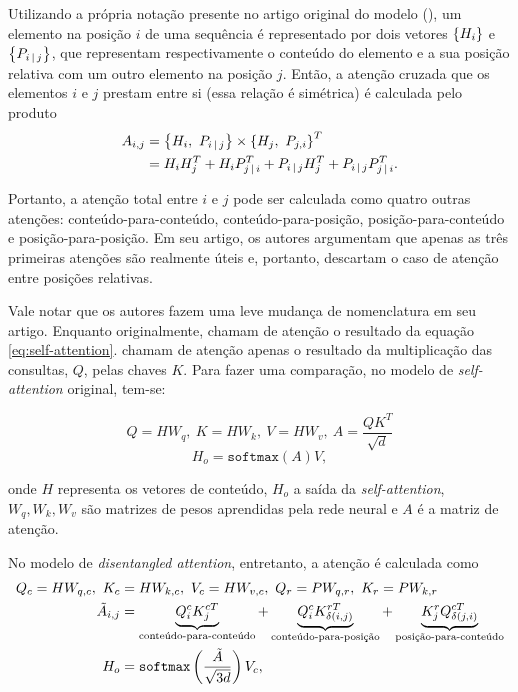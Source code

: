 Utilizando a própria notação presente no artigo original do modelo
(\cite{he-etal:2020:deberta}), um elemento na posição $i$ de uma sequência é
representado por dois vetores $\left\{ H_i \right\}$ e $\left\{ P_{i\,|\, j} \right\}$, que
representam respectivamente o conteúdo do elemento e a sua posição relativa com
um outro elemento na posição $j$. Então, a atenção cruzada que os elementos $i$
e $j$ prestam entre si (essa relação é simétrica) é calculada pelo produto
\begin{equation} \label{eq:deberta-atenttion}
\begin{split}
   A_{i,j}&=\left\{ H_i,~P_{i\,|\, j} \right\}\times\left\{ H_j,~P_{j,i} \right\}^{T} \\
          &=H_iH_j^{T} +
          H_iP_{j\,|\, i}^{T} +
          P_{i\,|\, j}H_j^{T} +
          P_{i\,|\, j}P_{j\,|\, i}^{T}.
\end{split}
\end{equation}

Portanto, a atenção total entre $i$ e $j$ pode ser calculada como quatro outras
atenções: conteúdo-para-conteúdo, conteúdo-para-posição, posição-para-conteúdo e
posição-para-posição. Em seu artigo, os autores argumentam que apenas as três
primeiras atenções são realmente úteis e, portanto, descartam o caso de atenção
entre posições relativas.

Vale notar que os autores fazem uma leve mudança de nomenclatura em seu artigo.
Enquanto originalmente, \cite{vaswani-etal:2017:attention-is-all-you-need}
chamam de atenção o resultado da equação \ref{eq:self-attention}.
\cite{he-etal:2020:deberta} chamam de atenção apenas o resultado da
multiplicação das consultas, $Q$, pelas chaves $K$. Para fazer uma comparação,
no modelo de \textit{self-attention} original, tem-se:

\[
Q=HW_q,~K=HW_k,~V=HW_v,~A=\dfrac{QK^{T}}{\sqrt{d}}
\]
\[
H_o=\texttt{softmax}(A)V,
\]

onde $H$ representa os vetores de conteúdo, $H_o$ a saída da
\textit{self-attention}, $W_q,W_k,W_v$ são matrizes de pesos aprendidas pela
rede neural e $A$ é a matriz de atenção.

No modelo de \textit{disentangled attention}, entretanto, a atenção é calculada
como
\begin{equation}
\begin{split}
   Q_c=HW_{q,c},~K_c&=HW_{k,c},~V_c=HW_{v,c},~Q_r=PW_{q,r},~K_r=PW_{k,r} \\
   \tilde{A}_{i,j}&=\underbrace{Q^{c}_iK^{cT}_j}_{\text{conteúdo-para-conteúdo}} +
   \underbrace{Q^{c}_iK^{rT}_{\delta(i,j)}}_{\text{conteúdo-para-posição}} +
   \underbrace{K^{r}_jQ^{cT}_{\delta(j,i)}}_{\text{posição-para-conteúdo}} \\
   H_o&=\texttt{softmax}\left( \dfrac{\tilde{A}}{\sqrt{3d}} \right)V_c,
\end{split}
\end{equation}

